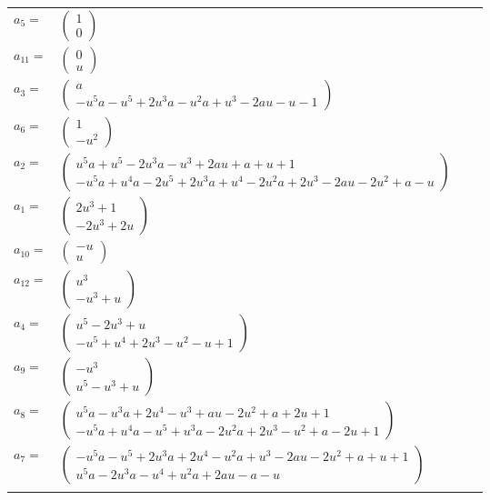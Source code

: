 \documentclass[1p]{elsarticle_modified}
\theoremstyle{definition}
\begin{document}
\begin{tabular}{m{7pt} m{180pt} m{7pt} m{180pt} }
\flushright $a_{5}=$&$\begin{pmatrix}1\\0\end{pmatrix}$ \\
\flushright $a_{11}=$&$\begin{pmatrix}0\\u\end{pmatrix}$ \\
\flushright $a_{3}=$&$\begin{pmatrix}a\\- u^5 a- u^5+2 u^3 a- u^2 a+u^3-2 a u- u-1\end{pmatrix}$ \\
\flushright $a_{6}=$&$\begin{pmatrix}1\\- u^2\end{pmatrix}$ \\
\flushright $a_{2}=$&$\begin{pmatrix}u^5 a+u^5-2 u^3 a- u^3+2 a u+a+u+1\\- u^5 a+u^4 a-2 u^5+2 u^3 a+u^4-2 u^2 a+2 u^3-2 a u-2 u^2+a- u\end{pmatrix}$ \\
\flushright $a_{1}=$&$\begin{pmatrix}2 u^3+1\\-2 u^3+2 u\end{pmatrix}$ \\
\flushright $a_{10}=$&$\begin{pmatrix}- u\\u\end{pmatrix}$ \\
\flushright $a_{12}=$&$\begin{pmatrix}u^3\\- u^3+u\end{pmatrix}$ \\
\flushright $a_{4}=$&$\begin{pmatrix}u^5-2 u^3+u\\- u^5+u^4+2 u^3- u^2- u+1\end{pmatrix}$ \\
\flushright $a_{9}=$&$\begin{pmatrix}- u^3\\u^5- u^3+u\end{pmatrix}$ \\
\flushright $a_{8}=$&$\begin{pmatrix}u^5 a- u^3 a+2 u^4- u^3+a u-2 u^2+a+2 u+1\\- u^5 a+u^4 a- u^5+u^3 a-2 u^2 a+2 u^3- u^2+a-2 u+1\end{pmatrix}$ \\
\flushright $a_{7}=$&$\begin{pmatrix}- u^5 a- u^5+2 u^3 a+2 u^4- u^2 a+u^3-2 a u-2 u^2+a+u+1\\u^5 a-2 u^3 a- u^4+u^2 a+2 a u- a- u\end{pmatrix}$\\&\end{tabular}
\end{document}
